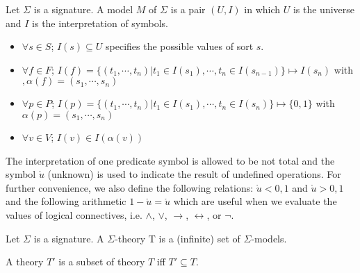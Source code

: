 \begin{definition}
Let $\Sigma$ is a signature. A model $M$ of $\Sigma$ is a pair $(U, I)$ in which $U$ is the universe and $I$ is the interpretation of symbols.
\begin{itemize}
\item $\forall s \in S$; $I(s) \subseteq U$ specifies the possible values of sort $s$.
\item $\forall f \in F$; $I(f) = \{(t_1,\cdots, t_n)| t_1 \in I(s_1),\cdots, t_n \in I(s_{n-1})\} \mapsto I(s_n)$ with $, \alpha(f) = (s_1,\cdots, s_n)$
\item $\forall p \in P$; $I(p) = \{(t_1,\cdots, t_n)| t_1 \in I(s_1),\cdots, t_n \in I(s_n)\} \mapsto \{0, 1\}$ with $\alpha(p) = (s_1,\cdots, s_n)$
\item $\forall v \in V$; $I(v) \in I(\alpha(v))$
\end{itemize}
\end{definition}

The interpretation of one predicate symbol is allowed to be not total and the symbol $\mathring{u}$ (unknown) is used to indicate the result of undefined operations. For further convenience, we also define the following relations: $\mathring{u} < 0, 1$ and $\mathring{u} > 0, 1$ and the following arithmetic $1 - \mathring{u} = \mathring{u}$ which are useful when we evaluate the values of logical connectives, i.e. $\wedge$, $\vee$, $\rightarrow$, $\leftrightarrow$, or $\neg$. 

\begin{definition}
Let $\Sigma$ is a signature. A $\Sigma$-theory T is a (infinite) set of $\Sigma$-models.
\end{definition}
A theory $T'$ is a subset of theory $T$ iff $T' \subseteq T$.

